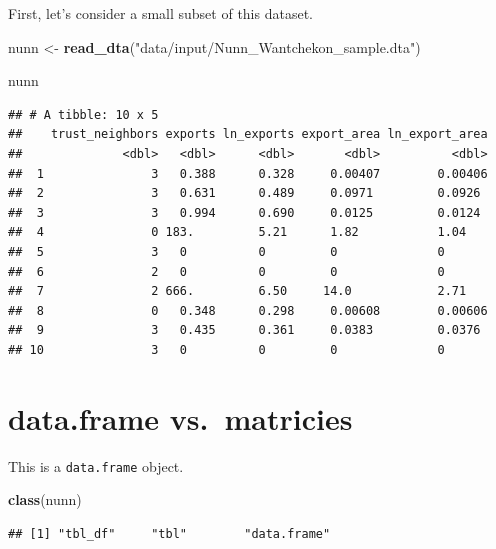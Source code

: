 \documentclass[]{book}
\newenvironment{Shaded}{\begin{snugshade}}{\end{snugshade}}
\newcommand{\KeywordTok}[1]{\textcolor[rgb]{0.13,0.29,0.53}{\textbf{#1}}}
\newcommand{\NormalTok}[1]{#1}
\newcommand{\StringTok}[1]{\textcolor[rgb]{0.31,0.60,0.02}{#1}}
\theoremstyle{definition}
\theoremstyle{definition}
\theoremstyle{definition}
\theoremstyle{remark}
\begin{document}
First, let's consider a small subset of this dataset.

\begin{Shaded}
\begin{Highlighting}[]
\NormalTok{nunn <{-}}\StringTok{ }\KeywordTok{read\_dta}\NormalTok{(}\StringTok{"data/input/Nunn\_Wantchekon\_sample.dta"}\NormalTok{)}
\end{Highlighting}
\end{Shaded}

\begin{Shaded}
\begin{Highlighting}[]
\NormalTok{nunn}
\end{Highlighting}
\end{Shaded}

\begin{verbatim}
## # A tibble: 10 x 5
##    trust_neighbors exports ln_exports export_area ln_export_area
##              <dbl>   <dbl>      <dbl>       <dbl>          <dbl>
##  1               3   0.388      0.328     0.00407        0.00406
##  2               3   0.631      0.489     0.0971         0.0926 
##  3               3   0.994      0.690     0.0125         0.0124 
##  4               0 183.         5.21      1.82           1.04   
##  5               3   0          0         0              0      
##  6               2   0          0         0              0      
##  7               2 666.         6.50     14.0            2.71   
##  8               0   0.348      0.298     0.00608        0.00606
##  9               3   0.435      0.361     0.0383         0.0376 
## 10               3   0          0         0              0
\end{verbatim}

\hypertarget{data.frame-vs.-matricies}{%
\section{data.frame vs.~matricies}\label{data.frame-vs.-matricies}}

This is a \texttt{data.frame} object.

\begin{Shaded}
\begin{Highlighting}[]
\KeywordTok{class}\NormalTok{(nunn)}
\end{Highlighting}
\end{Shaded}

\begin{verbatim}
## [1] "tbl_df"     "tbl"        "data.frame"
\end{verbatim}
\end{document}

